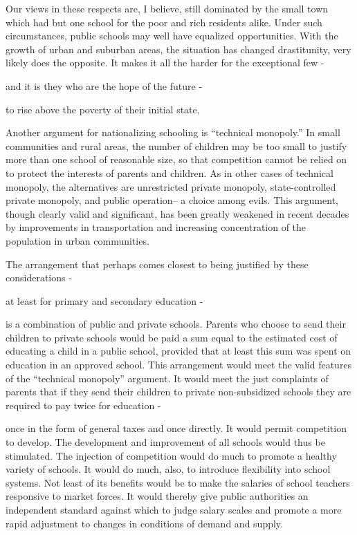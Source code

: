\documentclass[11pt,openany]{book}
\begin{document}
Our views in these respects are, I believe, still dominated by the small town which had but one school for the poor and rich residents alike. Under such circumstances, public schools may well have equalized opportunities. With the growth of urban and suburban areas, the situation has changed drastitunity, very likely does the opposite. It makes it all the harder for the exceptional few -

and it is they who are the hope of the future -

to rise above the poverty of their initial state.

Another argument for nationalizing schooling is ``technical monopoly.'' In small communities and rural areas, the number of children may be too small to justify more than one school of reasonable size, so that competition cannot be relied on to protect the interests of parents and children. As in other cases of technical monopoly, the alternatives are unrestricted private monopoly, state-controlled private monopoly, and public operation-- a choice among evils. This argument, though clearly valid and significant, has been greatly weakened in recent decades by improvements in transportation and increasing concentration of the population in urban communities.

The arrangement that perhaps comes closest to being justified by these considerations -

at least for primary and secondary education -

is a combination of public and private schools. Parents who choose to send their children to private schools would be paid a sum equal to the estimated cost of educating a child in a public school, provided that at least this sum was spent on education in an approved school. This arrangement would meet the valid features of the ``technical monopoly'' argument. It would meet the just complaints of parents that if they send their children to private non-subsidized schools they are required to pay twice for education -

once in the form of general taxes and once directly. It would permit competition to develop. The development and improvement of all schools would thus be stimulated. The injection of competition would do much to promote a healthy variety of schools. It would do much, also, to introduce flexibility into school systems. Not least of its benefits would be to make the salaries of school teachers responsive to market forces. It would thereby give public authorities an independent standard against which to judge salary scales and promote a more rapid adjustment to changes in conditions of demand and supply.
\end{document}
